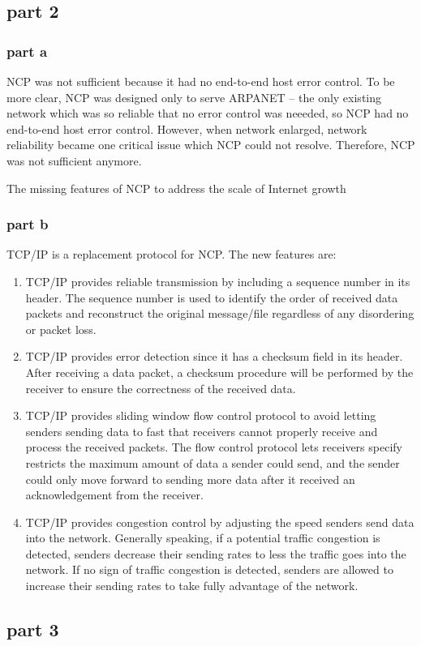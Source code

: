 \subsection{part 2}
\subsubsection{part a} NCP was not sufficient because it had no end-to-end host error control. To be more clear, NCP was designed only to serve ARPANET -- the only existing network which was so reliable that no error control was neeeded, so NCP had no end-to-end host error control. However, when network enlarged, network reliability became one critical issue which NCP could not resolve. Therefore, NCP was not sufficient anymore.

The missing features of NCP to address the scale of Internet growth
\subsubsection{part b} TCP/IP is a replacement protocol for NCP. The new features are:

\begin{enumerate}
\item TCP/IP provides reliable transmission by including a sequence number in its header. The sequence number is used to identify the order of received data packets and reconstruct the original message/file regardless of any disordering or packet loss.
\item TCP/IP provides error detection since it has a checksum field in its header. After receiving a data packet, a checksum procedure will be performed by the receiver to ensure the correctness of the received data.
\item TCP/IP provides sliding window flow control protocol to avoid letting senders sending data to fast that receivers cannot properly receive and process the received packets. The flow control protocol lets receivers specify restricts the maximum amount of data a sender could send, and the sender could only move forward to sending more data after it received an acknowledgement from the receiver.
\item TCP/IP provides congestion control by adjusting the speed senders send data into the network. Generally speaking, if a potential traffic congestion is detected, senders decrease their sending rates to less the traffic goes into the network. If no sign of traffic congestion is detected, senders are allowed to increase their sending rates to take fully advantage of the network.
\end{enumerate}

\subsection{part 3}










